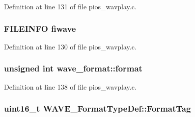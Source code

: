 \-Definition at line 131 of file pios\-\_\-wavplay.\-c.

\hypertarget{group___w_a_v_e_p_l_a_y_e_r___private___variables_gac9bc5ab0452e6a4f10de109bc847d6d5}{
\subsubsection[{fiwave}]{\setlength{\rightskip}{0pt plus 5cm}\-F\-I\-L\-E\-I\-N\-F\-O {\bf fiwave}}}\label{group___w_a_v_e_p_l_a_y_e_r___private___variables_gac9bc5ab0452e6a4f10de109bc847d6d5}


\-Definition at line 130 of file pios\-\_\-wavplay.\-c.

\hypertarget{group___w_a_v_e_p_l_a_y_e_r___private___variables_ga9d1757773fade2368a9707940f73a817}{
\subsubsection[{format}]{\setlength{\rightskip}{0pt plus 5cm}unsigned int {\bf wave\-\_\-format\-::format}}}\label{group___w_a_v_e_p_l_a_y_e_r___private___variables_ga9d1757773fade2368a9707940f73a817}


\-Definition at line 138 of file pios\-\_\-wavplay.\-c.

\hypertarget{group___w_a_v_e_p_l_a_y_e_r___private___variables_gaa0d6b4c06edc073395827674b4345820}{
\subsubsection[{\-Format\-Tag}]{\setlength{\rightskip}{0pt plus 5cm}uint16\-\_\-t {\bf \-W\-A\-V\-E\-\_\-\-Format\-Type\-Def\-::\-Format\-Tag}}}\label{group___w_a_v_e_p_l_a_y_e_r___private___variables_gaa0d6b4c06edc073395827674b4345820}


